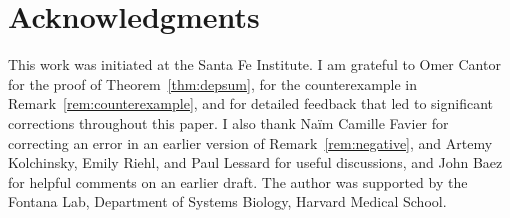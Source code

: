 \documentclass[12pt]{amsart}
\theoremstyle{plain}
\theoremstyle{definition}
\theoremstyle{remark}
\begin{document}
\section*{Acknowledgments}

This work was initiated at the Santa Fe Institute. I am grateful to Omer Cantor
for the proof of Theorem~\ref{thm:depsum}, for the counterexample in
Remark~\ref{rem:counterexample}, and for detailed feedback that led to
significant corrections throughout this paper. I also thank Na\"im Camille Favier
for correcting an error in an earlier version of Remark~\ref{rem:negative}, and
Artemy Kolchinsky, Emily Riehl, and Paul Lessard for useful discussions, and
John Baez for helpful comments on an earlier draft. The author was supported by the Fontana Lab, Department of Systems Biology, Harvard Medical School.



\end{document}
